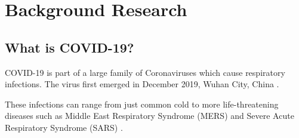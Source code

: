 \section{Background Research}
  \citetrackerfalse

  \subsection{What is COVID-19?}
    \par COVID-19 is part of a large family of Coronaviruses which cause respiratory infections. The virus first emerged in December 2019, Wuhan City, China \parencite{HealthGovAU}.
    \par These infections can range from just common cold to more life-threatening diseases such as Middle East Respiratory Syndrome (MERS) and Severe Acute Respiratory Syndrome (SARS) \parencite{Q&A_WHO}.

